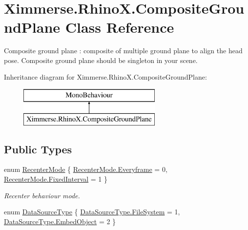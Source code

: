 \hypertarget{class_ximmerse_1_1_rhino_x_1_1_composite_ground_plane}{}\section{Ximmerse.\+Rhino\+X.\+Composite\+Ground\+Plane Class Reference}
\label{class_ximmerse_1_1_rhino_x_1_1_composite_ground_plane}


Composite ground plane \+: composite of multiple ground plane to align the head pose. Composite ground plane should be singleton in your scene.  


Inheritance diagram for Ximmerse.\+Rhino\+X.\+Composite\+Ground\+Plane\+:\begin{figure}[H]
\begin{center}
\leavevmode
\includegraphics[height=2.000000cm]{class_ximmerse_1_1_rhino_x_1_1_composite_ground_plane}
\end{center}
\end{figure}
\subsection*{Public Types}
\begin{DoxyCompactItemize}
\item 
enum \mbox{\hyperlink{class_ximmerse_1_1_rhino_x_1_1_composite_ground_plane_a04f66929fadbcaaf0d0f9c53cd856dfd}{Recenter\+Mode}} \{ \mbox{\hyperlink{class_ximmerse_1_1_rhino_x_1_1_composite_ground_plane_a04f66929fadbcaaf0d0f9c53cd856dfdae7052705ca5b1918757966609990e511}{Recenter\+Mode.\+Everyframe}} = 0, 
\mbox{\hyperlink{class_ximmerse_1_1_rhino_x_1_1_composite_ground_plane_a04f66929fadbcaaf0d0f9c53cd856dfda8fcbeb1464e18e07dc95e57674102532}{Recenter\+Mode.\+Fixed\+Interval}} = 1
 \}
\begin{DoxyCompactList}\small\item\em Recenter behaviour mode. \end{DoxyCompactList}\item 
enum \mbox{\hyperlink{class_ximmerse_1_1_rhino_x_1_1_composite_ground_plane_aeb2c4782a573590b210966a4def66f33}{Data\+Source\+Type}} \{ \mbox{\hyperlink{class_ximmerse_1_1_rhino_x_1_1_composite_ground_plane_aeb2c4782a573590b210966a4def66f33ae2d63d195b2bce9c8d5bf797a268bcec}{Data\+Source\+Type.\+File\+System}} = 1, 
\mbox{\hyperlink{class_ximmerse_1_1_rhino_x_1_1_composite_ground_plane_aeb2c4782a573590b210966a4def66f33af7dfd8b8613e5e20246ac81566cf8d5e}{Data\+Source\+Type.\+Embed\+Object}} = 2
 \}
\end{DoxyCompactItemize}
